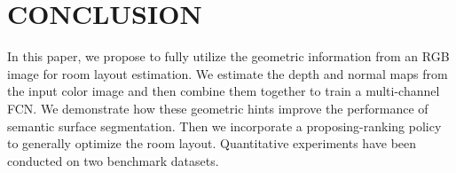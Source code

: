 \section{CONCLUSION}
\label{sec:Con}

In this paper, we propose to fully utilize the geometric information from an RGB image for room layout estimation. We estimate the depth and normal maps from the input color image and then combine them together to train a multi-channel FCN. We demonstrate how these geometric hints improve the performance of semantic surface segmentation. Then we incorporate a proposing-ranking policy to generally optimize the room layout. Quantitative experiments have been conducted on two benchmark datasets.